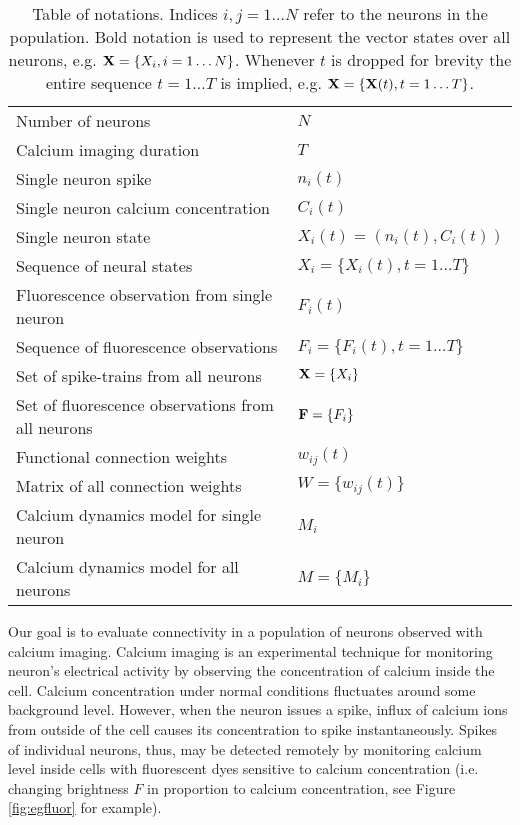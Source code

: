 \begin{table}[h!b!p!]
\caption{Table of notations. Indices $i, j=1\ldots N$ refer to the neurons in the population. Bold notation is used to represent the vector states over all neurons, e.g. ${\bf X}=\{X_i, i=1\ldots N\}$. Whenever $t$ is dropped for brevity the entire sequence $t=1\ldots T$ is implied, e.g. ${\bf X}=\{{\bf X}(t), t=1\ldots T\}$.}
\label{table:notation}
\begin{tabular}{ll}
Number of neurons         & $N$ \\
Calcium imaging duration & $T$ \\
Single neuron spike & $n_i(t)$ \\
Single neuron calcium concentration & $C_i(t)$ \\
Single neuron state & $X_i(t)=(n_i(t), C_i(t))$ \\
Sequence of neural states & $X_i=\{X_i(t), t=1\ldots T\}$ \\
Fluorescence observation from single neuron & $F_i(t)$ \\
Sequence of fluorescence observations & $F_i=\{F_i(t), t=1\ldots T\}$ \\
Set of spike-trains from all neurons   & ${\bf X}=\{X_i\}$ \\
Set of fluorescence observations from all neurons & ${\bf F}=\{F_i\}$ \\
Functional connection weights & $w_{ij}(t)$ \\
Matrix of all connection weights & $W=\{w_{ij}(t)\}$ \\
Calcium dynamics model for single neuron & $M_i$ \\
Calcium dynamics model for all neurons & $M=\{M_i\}$
\end{tabular}
\end{table}

Our goal is to evaluate connectivity in a population of neurons observed with calcium imaging.  Calcium imaging is an experimental technique for monitoring neuron's electrical activity  by observing the concentration of calcium inside the cell.  Calcium concentration under normal conditions fluctuates around some background level. However, when the neuron issues a spike, influx of calcium ions from outside of the cell causes its concentration to spike instantaneously.  Spikes of individual neurons, thus, may be detected remotely by monitoring calcium level inside cells with fluorescent dyes sensitive to calcium concentration (i.e. changing brightness $F$ in proportion to calcium concentration, see Figure \ref{fig:egfluor} for example).


